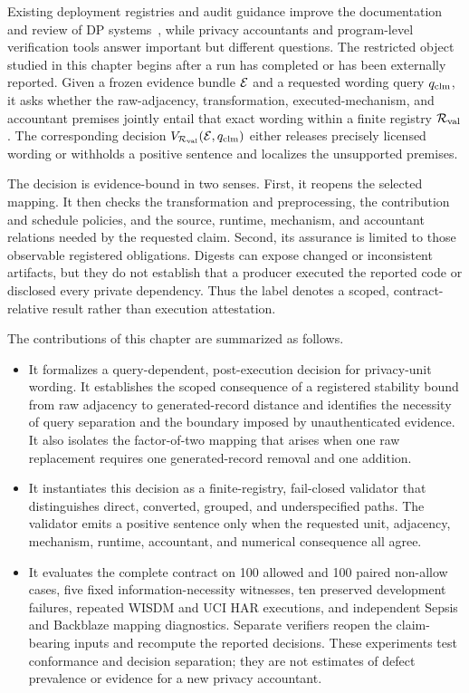 Existing deployment registries and audit guidance improve the documentation and
review of DP systems~\cite{altman2025registry,kifer2020guidelines}, while privacy
accountants and program-level verification tools answer important but different
questions.  The restricted object studied in this chapter begins after a run has
completed or has been externally reported.  Given a frozen evidence bundle
\(\mathcal{E}\) and a requested wording query \(q_{\mathrm{clm}}\), it asks whether
the raw-adjacency, transformation, executed-mechanism, and accountant premises
jointly entail that exact wording within a finite registry
\(\mathcal{R}_{\mathrm{val}}\).  The corresponding decision
\(V_{\mathcal{R}_{\mathrm{val}}}(\mathcal{E},q_{\mathrm{clm}})\) either releases precisely licensed
wording or withholds a positive sentence and localizes the unsupported premises.

The decision is evidence-bound in two senses.  First, it reopens the selected
mapping.  It then checks the transformation and preprocessing, the contribution
and schedule policies, and the source, runtime, mechanism, and accountant
relations needed by the requested claim.  Second, its assurance is limited to those observable registered
obligations.  Digests can expose changed or inconsistent artifacts, but they do not
establish that a producer executed the reported code or disclosed every private
dependency.  Thus the label  denotes a scoped,
contract-relative result rather than execution attestation.

\pagebreak[4]
The contributions of this chapter are summarized as follows.

\begin{itemize}
    \item It formalizes a query-dependent, post-execution decision for privacy-unit
    wording.  It establishes the scoped consequence of a registered stability
    bound from raw adjacency to generated-record distance and identifies the
    necessity of query separation and the boundary imposed by unauthenticated
    evidence.  It also
    isolates the factor-of-two mapping that arises when one raw replacement
    requires one generated-record removal and one addition.

    \item It instantiates this decision as a finite-registry, fail-closed validator
    that distinguishes direct, converted, grouped, and underspecified paths.  The
    validator emits a positive sentence only when the requested unit, adjacency,
    mechanism, runtime, accountant, and numerical consequence all agree.

    \item It evaluates the complete contract on 100 allowed and 100 paired
    non-allow cases, five fixed information-necessity witnesses, ten preserved
    development failures, repeated WISDM and UCI HAR executions, and independent
    Sepsis and Backblaze mapping diagnostics.  Separate verifiers reopen the
    claim-bearing inputs and recompute the reported decisions.  These experiments
    test conformance and decision separation; they are not estimates of defect
    prevalence or evidence for a new privacy accountant.
\end{itemize}


